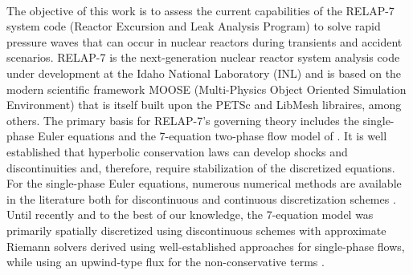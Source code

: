 \documentclass{inputs/mc2015}
\begin{document}

 \\
The objective of this work is to assess the current capabilities of the RELAP-7 system code (Reactor Excursion and Leak Analysis Program) \cite{Berry_Peterson_2014} to solve rapid pressure waves that can occur in nuclear reactors during transients and accident scenarios. RELAP-7 is the next-generation nuclear reactor system analysis code under development at the Idaho National Laboratory (INL) and is based on the modern scientific framework  MOOSE \cite{MOOSE} (Multi-Physics Object Oriented Simulation Environment) that is itself built upon the PETSc and LibMesh libraires, among others.
%
The primary basis for RELAP-7's governing theory includes the single-phase Euler equations \cite{Toro} and the 7-equation two-phase flow model of \cite{SEM, Berry_MC_2014}. It is well established that hyperbolic conservation laws can develop shocks and discontinuities \cite{Leveque} and, therefore, require stabilization of the discretized equations. For the single-phase Euler equations, numerous numerical methods are available in the literature both for discontinuous and continuous discretization schemes
\cite{Toro, Lapidus_paper, LMP, Lapidus_book, Roe, SUPG}. Until recently and to the best of our knowledge, the 7-equation model was primarily spatially discretized using discontinuous schemes with approximate 
Riemann solvers derived using well-established approaches for single-phase flows, while using an upwind-type flux for the non-conservative terms 
\cite{Saurel_2001a, Saurel_2001b, Li_2004, Zein_2010, Ambroso_2012}. 
\end{document}
